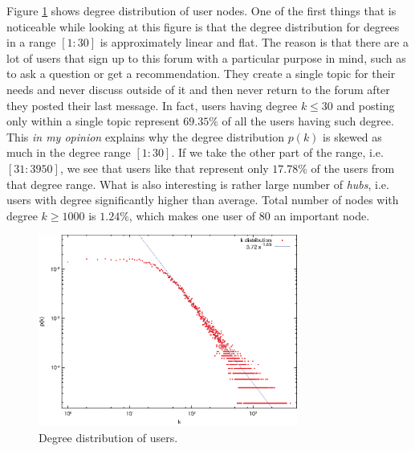     Figure \ref{fig:degdist_users} shows degree distribution of user nodes. One of the first things that is noticeable while looking at this figure is that the degree distribution for degrees in a range $[1:30]$ is approximately linear and flat. The reason is that there are a lot of users that sign up to this forum with a particular purpose in mind, such as to ask a question or get a recommendation. They create a single topic for their needs and never discuss outside of it and then never return to the forum after they posted their last message. In fact, users having degree $k \leq 30$ and posting only within a single topic represent $69.35\%$ of all the users having such degree. This \emph{in my opinion} explains why the degree distribution $p(k)$ is skewed as much in the degree range $[1:30]$. If we take the other part of the range, i.e. $[31:3950]$, we see that users like that represent only $17.78\%$ of the users from that degree range.
    What is also interesting is rather large number of \emph{hubs}, i.e. users with degree significantly higher than average. Total number of nodes with degree $k \geq 1000$ is $1.24\%$, which makes one user of 80 an important node.
    \begin{figure}[H]
      \centering
      \includegraphics[width=0.76\textwidth]{chapters/03_implementation/degdist_users}
      \caption{Degree distribution of users.}
      \label{fig:degdist_users}
    \end{figure}
    
